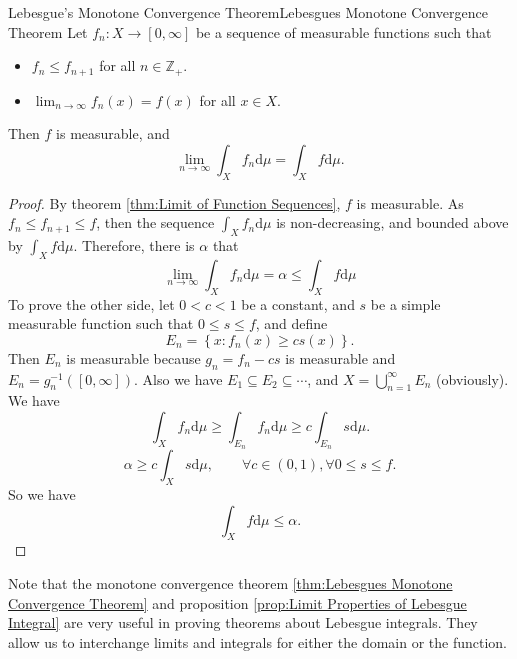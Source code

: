 \documentclass[../main.tex]{subfiles}
\begin{document}
\begin{theorem}{Lebesgue's Monotone Convergence Theorem}{Lebesgues Monotone Convergence Theorem}
	Let $f_n: X \rightarrow [0,\infty ]$ be a sequence of measurable functions such that
	\begin{itemize}
		\item $f_n \leq f_{n+1}$ for all $n\in \mathbb{Z}_+$.
		\item $\lim_{n\rightarrow \infty } f_n(x) = f(x)$ for all $x\in X$.
	\end{itemize}
	Then $f$ is measurable, and
	\begin{equation}
		\lim_{n\rightarrow \infty } \int_X f_n \mathrm{d} \mu = \int_X f \mathrm{d} \mu.
	\end{equation}
\end{theorem}
\begin{proof}
	By theorem \ref{thm:Limit of Function Sequences}, $f$ is measurable. As $f_n\leq f_{n+1}\leq f$, then the sequence $\int_X f_n \mathrm{d} \mu$ is non-decreasing, and bounded above by $\int_X f \mathrm{d} \mu$. Therefore, there is $\alpha$ that
	\begin{equation*}
		\lim_{n\rightarrow \infty } \int_X f_n \mathrm{d} \mu = \alpha \leq \int_X f \mathrm{d} \mu
	\end{equation*}
	To prove the other side, let $0<c<1$ be a constant, and $s$ be a simple measurable function such that $0\leq s \leq f$, and define
	\begin{equation*}
		E_n = \left\{ x: f_n(x) \geq c s(x) \right\}.
	\end{equation*}
	Then $E_n$ is measurable because $g_n = f_n-cs$ is measurable and $E_n = g_n^{-1}([0,\infty ])$. Also we have $E_1 \subseteq E_2 \subseteq \cdots$, and $X = \bigcup_{n=1}^{\infty } E_n$ (obviously). We have
	\begin{equation*}
		\int_X f_n \mathrm{d} \mu \geq \int_{E_n} f_n \mathrm{d} \mu \geq c \int_{E_n} s \mathrm{d} \mu.
	\end{equation*}
	\begin{equation*}
		\alpha \geq c\int_X s \mathrm{d} \mu, \qquad \forall c\in (0,1), \forall 0\leq s \leq f.
	\end{equation*}
	So we have
	\begin{equation*}
		\int_X f \mathrm{d} \mu \leq \alpha.
	\end{equation*}
\end{proof}

\begin{remark}
	Note that the monotone convergence theorem \ref{thm:Lebesgues Monotone Convergence Theorem} and proposition \ref{prop:Limit Properties of Lebesgue Integral} are very useful in proving theorems about Lebesgue integrals. They allow us to interchange limits and integrals for either the domain or the function.
\end{remark}
\end{document}
